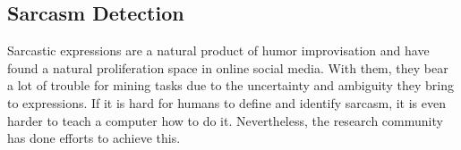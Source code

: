 \documentclass[12pt,a4paper]{report}
\theoremstyle{definition}
\begin{document}
\begin{CJK}{UTF8}{bsmi}
    \section{Sarcasm Detection}
    \par Sarcastic expressions are a natural product of humor improvisation and have found a natural proliferation space in online social media. With them, they bear a lot of trouble for mining tasks due to the uncertainty and ambiguity they bring to expressions. If it is hard for humans to define and identify sarcasm, it is even harder to teach a computer how to do it. Nevertheless, the research community has done efforts to achieve this.

\end{CJK}
\end{document}
